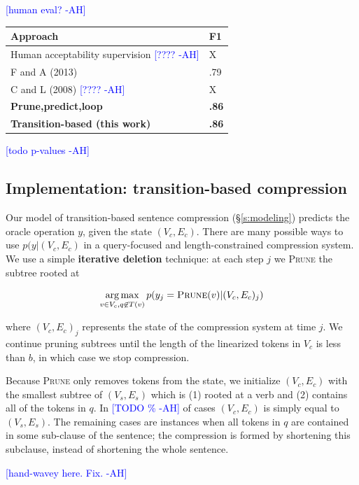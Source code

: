 \documentclass[11pt,a4paper]{article}
\newcommand{\ahcomment}[1]{\textcolor{blue}{[#1 -AH]}}
\DeclareMathOperator*{\argmaxA}{arg\,max} %
\begin{document}
\ahcomment{human eval?}
    
\begin{table}[htb!]
\begin{tabular}{ll}
\centering
Approach & F1  \\ \hline
Human acceptability supervision \ahcomment{????}        &  X        \\
F and A (2013)    & .79           \\
C and L (2008)  \ahcomment{????}  & X      \\
\textbf{Prune,predict,loop} &  \textbf{.86}    \\ 
\textbf{Transition-based (this work)} &  \textbf{.86}    \\   
\end{tabular}
\end{table}

\ahcomment{todo p-values}


\subsection{Implementation: transition-based compression}\label{s:transition}

Our model of transition-based sentence compression (\S\ref{s:modeling}) predicts the oracle operation $y$, given the state $(V_c, E_c)$. There are many possible ways to use $p(y|(V_c, E_c)$ in a query-focused and length-constrained compression system. We use a simple \textbf{iterative deletion} technique: at each step $j$ we \textsc{Prune} the subtree rooted at 

$$\argmaxA_{v \in V_c,q\not\in T(v)}   p(y_j = \textsc{Prune}(v) | (V_c, E_c)_j)$$

\noindent where $(V_c, E_c)_j$ represents the state of the compression system at time $j$. We continue pruning subtrees until the length of the linearized tokens in $V_c$ is less than $b$, in which case we stop compression. 

Because \textsc{Prune} only removes tokens from the state, we initialize $(V_c, E_c)$ with the smallest subtree of $(V_s, E_s)$ which is (1) rooted at a verb and (2) contains all of the tokens in $q$. In \ahcomment{TODO \%} of cases $(V_c, E_c)$ is simply equal to $(V_s, E_s)$. The remaining cases are instances when all tokens in $q$ are contained in some sub-clause of the sentence; the compression is formed by shortening this subclause, instead of shortening the whole sentence.

\ahcomment{hand-wavey here. Fix.}
\end{document}
